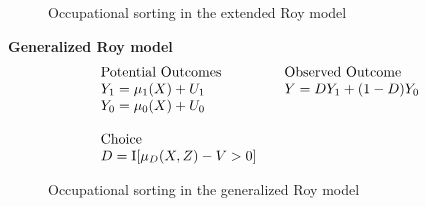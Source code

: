 \begin{frame}
	\begin{figure}[htp]\centering
		\caption{Occupational sorting in the extended Roy model}
	\end{figure}
\end{frame}
\begin{frame}
	\textbf{Generalized Roy model}
	\begin{align*}\begin{array}{l@{\qquad}l}
			\text{Potential Outcomes} &\text{Observed Outcome}\\
			Y_1 = \mu_1(X) + U_1      &  Y = D Y_1 + (1 - D)Y_0 \\
			Y_0 = \mu_0(X) + U_0      &\\
			& \\
			\text{Choice} & \\
			D = \mathrm{I}[\mu_D(X, Z) - V > 0] & \\
		\end{array}
	\end{align*}
\end{frame}
\begin{frame}
	\begin{figure}[htp]\centering
		\caption{Occupational sorting in the generalized Roy model}
	\end{figure}
\end{frame}
